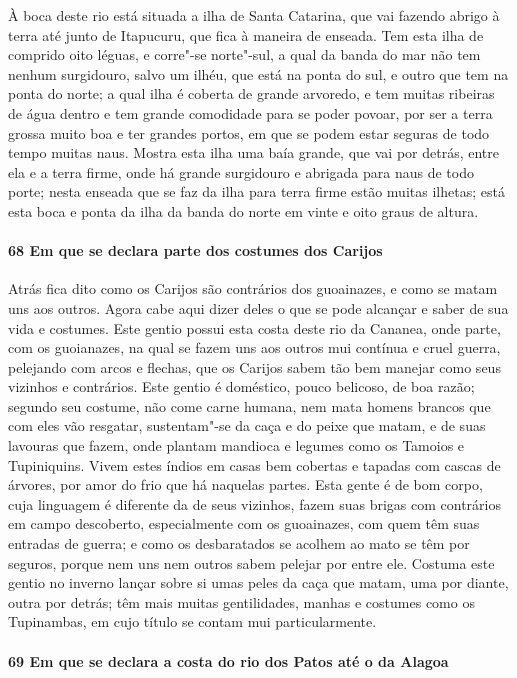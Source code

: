 À boca deste rio está situada a ilha de Santa Catarina, que vai fazendo abrigo à terra até
junto de Itapucuru, que fica à maneira de enseada. Tem esta ilha de comprido oito léguas,
e corre"-se norte"-sul, a qual da banda do mar não tem nenhum surgidouro, salvo um ilhéu,
que está na ponta do sul, e outro que tem na ponta do norte; a qual ilha é coberta de
grande arvoredo, e tem muitas ribeiras de água dentro e tem grande comodidade para se
poder povoar, por ser a terra grossa muito boa e ter grandes portos, em que se podem estar
seguras de todo tempo muitas naus. Mostra esta ilha uma baía grande, que vai por detrás,
entre ela e a terra firme, onde há grande surgidouro e abrigada para naus de todo porte;
nesta enseada que se faz da ilha para terra firme estão muitas ilhetas; está esta boca e
ponta da ilha da banda do norte em vinte e oito graus de altura.

\paragraph{68 Em que se declara parte dos costumes dos Carijos}

Atrás fica dito como os Carijos são contrários dos guoainazes, e como se matam uns aos
outros. Agora cabe aqui dizer deles o que se pode alcançar e saber de sua vida e costumes.
Este gentio possui esta costa deste rio da Cananea, onde parte, com os guoianazes, na qual
se fazem uns aos outros mui contínua e cruel guerra, pelejando com arcos e flechas, que os
Carijos sabem tão bem manejar como seus vizinhos e contrários. Este gentio é doméstico,
pouco belicoso, de boa razão; segundo seu costume, não come carne humana, nem mata homens
brancos que com eles vão resgatar, sustentam"-se da caça e do peixe que matam, e de suas
lavouras que fazem, onde plantam mandioca e legumes como os Tamoios e Tupiniquins. Vivem
estes índios em casas bem cobertas e tapadas com cascas de árvores, por amor do frio que
há naquelas partes. Esta gente é de bom corpo, cuja linguagem é diferente da de seus
vizinhos, fazem suas brigas com contrários em campo descoberto, especialmente com os
guoainazes, com quem têm suas entradas de guerra; e como os desbaratados se acolhem ao
mato se têm por seguros, porque nem uns nem outros sabem pelejar por entre ele. Costuma
este gentio no inverno lançar sobre si umas peles da caça que matam, uma por diante, outra
por detrás; têm mais muitas gentilidades, manhas e costumes como os Tupinambas, em cujo
título se contam mui particularmente.

\paragraph{69 Em que se declara a costa do rio dos Patos até o da Alagoa}

